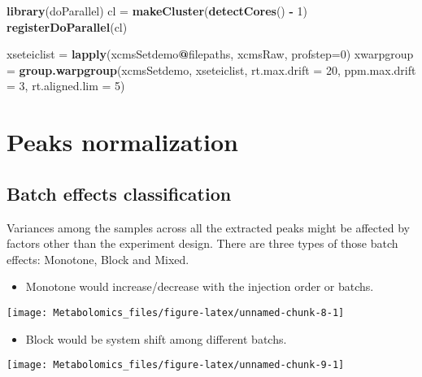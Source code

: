 \documentclass[
]{book}
\newenvironment{Shaded}{\begin{snugshade}}{\end{snugshade}}
\newcommand{\DataTypeTok}[1]{\textcolor[rgb]{0.13,0.29,0.53}{#1}}
\newcommand{\DecValTok}[1]{\textcolor[rgb]{0.00,0.00,0.81}{#1}}
\newcommand{\KeywordTok}[1]{\textcolor[rgb]{0.13,0.29,0.53}{\textbf{#1}}}
\newcommand{\NormalTok}[1]{#1}
\newcommand{\OperatorTok}[1]{\textcolor[rgb]{0.81,0.36,0.00}{\textbf{#1}}}
\newcommand{\StringTok}[1]{\textcolor[rgb]{0.31,0.60,0.02}{#1}}
\providecommand{\tightlist}{%
  \setlength{\itemsep}{0pt}\setlength{\parskip}{0pt}}
\begin{document}
\begin{Shaded}
\begin{Highlighting}[]
\KeywordTok{library}\NormalTok{(doParallel)}
\NormalTok{cl =}\StringTok{ }\KeywordTok{makeCluster}\NormalTok{(}\KeywordTok{detectCores}\NormalTok{() }\OperatorTok{-}\StringTok{ }\DecValTok{1}\NormalTok{)}
\KeywordTok{registerDoParallel}\NormalTok{(cl)}

\NormalTok{xseteiclist =}\StringTok{ }\KeywordTok{lapply}\NormalTok{(xcmsSetdemo}\OperatorTok{@}\NormalTok{filepaths, xcmsRaw, }\DataTypeTok{profstep=}\DecValTok{0}\NormalTok{)}
\NormalTok{xwarpgroup =}\StringTok{ }\KeywordTok{group.warpgroup}\NormalTok{(xcmsSetdemo, xseteiclist, }\DataTypeTok{rt.max.drift =} \DecValTok{20}\NormalTok{, }\DataTypeTok{ppm.max.drift =} \DecValTok{3}\NormalTok{, }\DataTypeTok{rt.aligned.lim =} \DecValTok{5}\NormalTok{)}
\end{Highlighting}
\end{Shaded}

\hypertarget{peaks-normalization}{%
\chapter{Peaks normalization}\label{peaks-normalization}}

\hypertarget{batch-effects-classification}{%
\section{Batch effects classification}\label{batch-effects-classification}}

Variances among the samples across all the extracted peaks might be affected by factors other than the experiment design. There are three types of those batch effects: Monotone, Block and Mixed.

\begin{itemize}
\tightlist
\item
  Monotone would increase/decrease with the injection order or batchs.
\end{itemize}

\texttt{[image: Metabolomics\_files/figure-latex/unnamed-chunk-8-1]}

\begin{itemize}
\tightlist
\item
  Block would be system shift among different batchs.
\end{itemize}

\texttt{[image: Metabolomics\_files/figure-latex/unnamed-chunk-9-1]}
\end{document}
